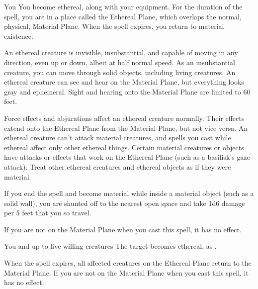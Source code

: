 \begin{spellheader}
    \spelldur{\durshort \dismissable}
\end{spellheader}
\begin{spelleffects}
    \begin{spelltarget}{You}
        \spelleffect You become ethereal, along with your equipment. For the duration of the spell, you are in a place called the Ethereal Plane, which overlaps the normal, physical, Material Plane. When the spell expires, you return to material existence.
        \par An ethereal creature is invisible, insubstantial, and capable of moving in any direction, even up or down, albeit at half normal speed. As an insubstantial creature, you can move through solid objects, including living creatures. An ethereal creature can see and hear on the Material Plane, but everything looks gray and ephemeral. Sight and hearing onto the Material Plane are limited to 60 feet.
        \par Force effects and abjurations affect an ethereal creature normally. Their effects extend onto the Ethereal Plane from the Material Plane, but not vice versa. An ethereal creature can't attack material creatures, and spells you cast while ethereal affect only other ethereal things. Certain material creatures or objects have attacks or effects that work on the Ethereal Plane (such as a basilisk's gaze attack). Treat other ethereal creatures and ethereal objects as if they were material. 
        \par If you end the spell and become material while inside a material object (such as a solid wall), you are shunted off to the nearest open space and take 1d6 damage per 5 feet that you so travel.
    \end{spelltarget}
\end{spelleffects}
\begin{spellfooter}
    \spellnotes If you are not on the Material Plane when you cast this spell, it has no effect.
\end{spellfooter}

\begin{spellheader}
\end{spellheader}
\begin{spelleffects}
    \begin{spelltarget}{You and up to five willing creatures}
        \spelleffect The target becomes ethereal, as .
    \end{spelltarget}
\end{spelleffects}
\begin{spellfooter}
    \spellnotes When the spell expires, all affected creatures on the Ethereal Plane return to the Material Plane. If you are not on the Material Plane when you cast this spell, it has no effect.
\end{spellfooter}

